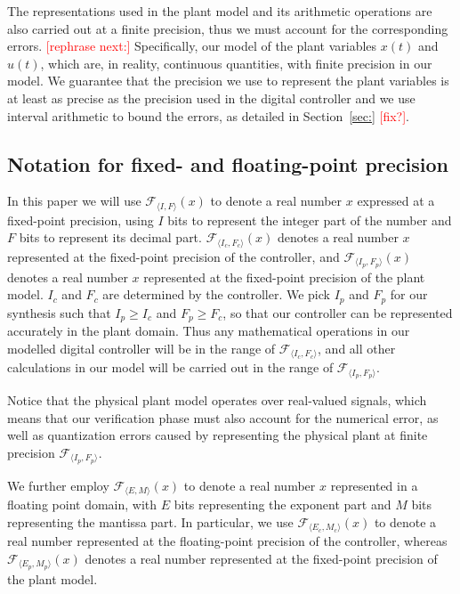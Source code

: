 \documentclass[twocolumn]{autart}    %
\renewcommand{\note}[1]{\textcolor{red}{[#1]}}
\begin{document}
The representations used in the plant model and its arithmetic operations are also carried out at a finite precision, 
thus we must account for the corresponding errors.  
\note{rephrase next:} Specifically, our model of the plant variables $x(t)$ and $u(t)$, which are, in reality, continuous quantities, with finite precision in our model. 
We guarantee that the precision we use to represent the plant variables is at least as precise as the precision used in the digital controller and we use interval arithmetic to bound the errors, as detailed in Section~\ref{sec:} \note{fix?}. 

\subsection{Notation for fixed- and floating-point precision}  

In this paper we will use $\mathcal{F}_{\langle I,F \rangle}(x)$ to denote a real number $x$ expressed at a fixed-point precision, 
using $I$ bits to represent the integer part of the number and $F$ bits to represent its decimal part.  
$\mathcal{F}_{\langle I_c,F_c \rangle}(x)$ denotes a real number $x$ represented at the fixed-point precision of the controller, 
and $\mathcal{F}_{\langle I_p,F_p \rangle}(x)$ denotes a real number $x$
represented at the fixed-point precision of the plant model. 
$I_c$ and $F_c$ are determined by the controller.  We pick $I_p$ and $F_p$ for our synthesis
such that $I_p \geq I_c$ and $\allowbreak F_p \geq F_c$, so that our controller 
can be represented accurately in the plant domain.    
Thus any mathematical operations in our modelled digital controller will be in the
range of $\mathcal{F}_{\langle I_c,F_c \rangle}$, and all other calculations
in our model will be carried out in the range of $\mathcal{F}_{\langle
I_p,F_p \rangle}$.  

Notice that the physical plant model operates over real-valued signals, 
which means that our verification phase must also account for the numerical error, 
as well as quantization errors caused by representing the physical plant at finite 
precision $\mathcal{F}_{\langle I_p,F_p \rangle}$. 
 
We further employ $\mathcal{F}_{\langle E,M \rangle}(x)$ to denote a real number $x$ represented in a floating point domain, 
with $E$ bits representing the exponent part and $M$ bits representing the mantissa part. 
In particular, 
we use $\mathcal{F}_{\langle E_c,M_c \rangle}(x)$ to denote a real number 
represented at the floating-point precision of the controller, 
whereas $\mathcal{F}_{\langle E_p,M_p \rangle}(x)$ denotes a real number represented at the fixed-point precision of the plant model.  
\end{document}
